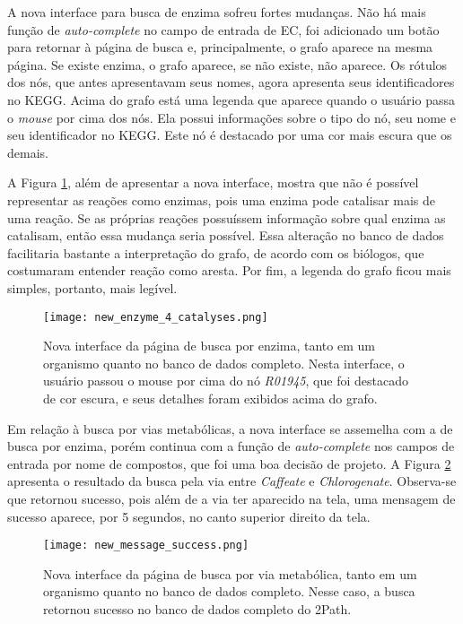 \indent A nova interface para busca de enzima sofreu fortes mudanças. Não há mais função de \textit{auto-complete} no campo de entrada de EC, foi adicionado um botão para retornar à página de busca e, principalmente, o grafo aparece na mesma página. Se existe enzima, o grafo aparece, se não existe, não aparece. Os rótulos dos nós, que antes apresentavam seus nomes, agora apresenta seus identificadores no KEGG. Acima do grafo está uma legenda que aparece quando o usuário passa o \textit{mouse} por cima dos nós. Ela possui informações sobre o tipo do nó, seu nome e seu identificador no KEGG. Este nó é destacado por uma cor mais escura que os demais.

\indent A Figura \ref{fig:new_enzyme_4_catalyses}, além de apresentar a nova interface, mostra que não é possível representar as reações como enzimas, pois uma enzima pode catalisar mais de uma reação. Se as próprias reações possuíssem informação sobre qual enzima as catalisam, então essa mudança seria possível. Essa alteração no banco de dados facilitaria bastante a interpretação do grafo, de acordo com os biólogos, que costumaram entender reação como aresta. Por fim, a legenda do grafo ficou mais simples, portanto, mais legível.

\begin{figure}[!h]
	\centering
	\texttt{[image: new\_enzyme\_4\_catalyses.png]}
	\caption{Nova interface da página de busca por enzima, tanto em um organismo quanto no banco de dados completo. Nesta interface, o usuário passou o mouse por cima do nó \textit{R01945}, que foi destacado de cor escura, e seus detalhes foram exibidos acima do grafo.}
	\label{fig:new_enzyme_4_catalyses}
\end{figure}

\indent Em relação à busca por vias metabólicas, a nova interface se assemelha com a de busca por enzima, porém continua com a função de \textit{auto-complete} nos campos de entrada por nome de compostos, que foi uma boa decisão de projeto. A Figura \ref{fig:new_message_success} apresenta o resultado da busca pela via entre \textit{Caffeate} e \textit{Chlorogenate}. Observa-se que retornou sucesso, pois além de a via ter aparecido na tela, uma mensagem de sucesso aparece, por 5 segundos, no canto superior direito da tela.

\begin{figure}[!h]
    \centering
    \texttt{[image: new\_message\_success.png]}
    \caption{Nova interface da página de busca por via metabólica, tanto em um organismo quanto no banco de dados completo. Nesse caso, a busca retornou sucesso no banco de dados completo do 2Path.}
    \label{fig:new_message_success}
\end{figure}


